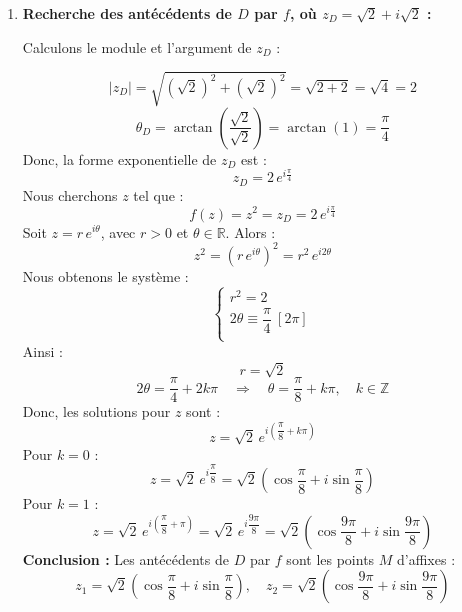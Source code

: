 \documentclass[a4paper,12pt]{article}
\begin{document}
\begin{solutionbox}
\begin{enumerate}
\begin{enumerate}
        Donc :
        \[
        f(B) = 16 \left( -\dfrac{1}{2} + i \dfrac{\sqrt{3}}{2} \right) = -8 + 8 i \sqrt{3}
        \]

        \textbf{Conclusion :} \( f(B) \) a pour affixe \( -8 + 8 i \sqrt{3} \).

        \item \textbf{Recherche des antécédents de \( D \) par \( f \), où \( z_D = \sqrt{2} + i \sqrt{2} \) :}

        Calculons le module et l'argument de \( z_D \) :

        \[
        |z_D| = \sqrt{ (\sqrt{2})^2 + (\sqrt{2})^2 } = \sqrt{2 + 2} = \sqrt{4} = 2
        \]
        \[
        \theta_D = \arctan\left( \dfrac{\sqrt{2}}{\sqrt{2}} \right) = \arctan(1) = \dfrac{\pi}{4}
        \]
        Donc, la forme exponentielle de \( z_D \) est :
        \[
        z_D = 2 \, e^{i \frac{\pi}{4}}
        \]
        Nous cherchons \( z \) tel que :
        \[
        f(z) = z^2 = z_D = 2 \, e^{i \frac{\pi}{4}}
        \]
        Soit \( z = r \, e^{i \theta} \), avec \( r > 0 \) et \( \theta \in \mathbb{R} \). Alors :
        \[
        z^2 = (r \, e^{i \theta})^2 = r^2 \, e^{i 2\theta}
        \]
        Nous obtenons le système :
        \[
        \begin{cases}
        r^2 = 2 \\
        2\theta \equiv \dfrac{\pi}{4} \ [2\pi] \\
        \end{cases}
        \]
        Ainsi :
        \[
        r = \sqrt{2}
        \]
        \[
        2\theta = \dfrac{\pi}{4} + 2k\pi \quad \Rightarrow \quad \theta = \dfrac{\pi}{8} + k\pi, \quad k \in \mathbb{Z}
        \]
        Donc, les solutions pour \( z \) sont :
        \[
        z = \sqrt{2} \, e^{i \left( \dfrac{\pi}{8} + k\pi \right )}
        \]
        Pour \( k = 0 \) :
        \[
        z = \sqrt{2} \, e^{i \dfrac{\pi}{8}} = \sqrt{2} \left( \cos \dfrac{\pi}{8} + i \sin \dfrac{\pi}{8} \right )
        \]
        Pour \( k = 1 \) :
        \[
        z = \sqrt{2} \, e^{i \left( \dfrac{\pi}{8} + \pi \right )} = \sqrt{2} \, e^{i \dfrac{9\pi}{8}} = \sqrt{2} \left( \cos \dfrac{9\pi}{8} + i \sin \dfrac{9\pi}{8} \right )
        \]
        \textbf{Conclusion :} Les antécédents de \( D \) par \( f \) sont les points \( M \) d'affixes :
        \[
        z_1 = \sqrt{2} \left( \cos \dfrac{\pi}{8} + i \sin \dfrac{\pi}{8} \right ), \quad z_2 = \sqrt{2} \left( \cos \dfrac{9\pi}{8} + i \sin \dfrac{9\pi}{8} \right )
        \]


\end{enumerate}
\end{enumerate}
\end{solutionbox}
\end{document}
